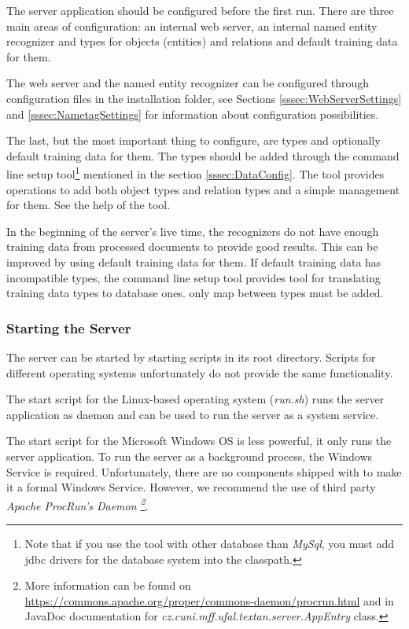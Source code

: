 The \textan{} server application should be configured before the first run. There
are three main areas of configuration: an internal web server, an internal named
entity recognizer and types for objects (entities) and relations and default training
data for them.

The web server and the named entity recognizer can be configured through configuration
files in the installation folder, see Sections \ref{sssec:WebServerSettings} and
\ref{sssec:NametagSettings} for information about configuration possibilities.

The last, but the most important thing to configure, are types and optionally
default training data for them. The types should be added through the command
line setup tool\footnote{Note that if you use the tool with other database than
\emph{MySql}, you must add jdbc drivers for the database system into the classpath.}
mentioned in the section \ref{sssec:DataConfig}. The tool provides operations to
add both object types and relation types and a simple management for them. See
the help of the tool.

In the beginning of the server's live time, the recognizers do not have enough
training data from processed documents to provide good results. This can be
improved by using default training data for them.
If default training data has incompatible types, the command line setup tool provides
tool for translating training data types to database ones. only map between types must be added.

\subsubsection{Starting the Server}

The server can be started by starting scripts in its root directory. Scripts for
different operating systems unfortunately do not provide the same functionality.

The start script for the Linux-based operating system (\emph{run.sh}) runs the
server application as daemon and can be used to run the server as a system service.

The start script for the Microsoft Windows OS is less powerful, it only runs the
server application. To run the server as a background process, the Windows
Service is required. Unfortunately, there are no components shipped with
\textan{} to make it a formal Windows Service. However, we recommend the use of
third party \emph{Apache Proc\-Run's Daemon \footnote{More information can be
found on \url{https://commons.apache.org/proper/commons-daemon/procrun.html}
and in JavaDoc documentation for \emph{cz.\-cuni.\-mff.\-ufal.\-textan.\-server.\-AppEntry}
class.}}.

